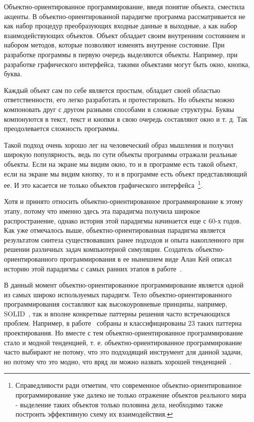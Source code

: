 Объектно-ориентированное программирование, введя понятие объекта, сместила акценты. В объектно-ориентированной парадигме программа рассматривается не как набор процедур преобразующих входные данные в выходные, а как набор взаимодействующих объектов. Объект обладает своим внутренним состоянием и набором методов, которые позволяют изменять внутренне состояние. При разработке программы в первую очередь выделяются объекты. Например, при разработке графического интерфейса, такими объектами могут быть окно, кнопка, буква.

Каждый объект сам по себе является простым, обладает своей областью ответственности, его легко разработать и протестировать. Но объекты можно компоновать друг с другом разными способами в сложные структуры. Буквы компонуются в текст, текст и кнопки в свою очередь составляют окно и т. д. Так преодолевается сложность программы.

Такой подход очень хорошо лег на человеческий образ мышления и получил широкую популярность, ведь по сути объекты программы отражали реальные объекты. Если на экране мы видим окно, то и в программе есть такой объект, если на экране мы видим кнопку, то и в программе есть объект представляющий ее. И это касается не только объектов графического интерфейса~\footnote{Справедливости ради отметим, что современное объектно-ориентированное программирование уже далеко не только отражение объектов реального мира - выделение таких объектов только половина дела, необходимо также построить эффективную схему их взаимодействия.}.

Хотя и принято относить объектно-ориентированное программирование к этому этапу, потому что именно здесь эта парадигма получила широкое распространение, однако история этой парадигмы начинается еще с 60-х годов. Как уже отмечалось выше, объектно-ориентированная парадигма является результатом синтеза существовавших ранее подходов и опыта накопленного при решении различных задач компьютерной симуляции. Создатель объектно-ориентированного программирования в ее нынешнем виде Алан Кей описал историю этой парадигмы с самых ранних этапов в работе~\cite{Kay:1996:EHS}.

В данный момент объектно-ориентированное программирование является одной из самых широко используемых парадигм. Тело объектно-ориентированного программирования составляют как высокоуровневые принципы, например, SOLID~\cite{SOLID}, так и вполне конкретные паттерны решения часто встречающихся проблем. Например, в работе~\cite{Gamma:1995:DPE} собраны и классифицированы 23 таких паттерна проектирования. Но вместе с тем объектно-ориентированное программирование стало и модной тенденцией, т. е. объектно-ориентированное программирование часто выбирают не потому, что это подходящий инструмент для данной задачи, но потому что это модно, что вряд ли можно назвать хорошей тенденцией~\cite{Wirth:2008:HIST}.

